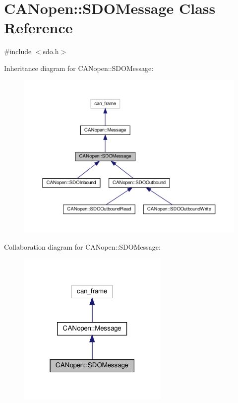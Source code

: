 \hypertarget{class_c_a_nopen_1_1_s_d_o_message}{}\section{C\+A\+Nopen\+:\+:S\+D\+O\+Message Class Reference}
\label{class_c_a_nopen_1_1_s_d_o_message}


{\ttfamily \#include $<$sdo.\+h$>$}



Inheritance diagram for C\+A\+Nopen\+:\+:S\+D\+O\+Message\+:\nopagebreak
\begin{figure}[H]
\begin{center}
\leavevmode
\includegraphics[width=350pt]{class_c_a_nopen_1_1_s_d_o_message__inherit__graph}
\end{center}
\end{figure}


Collaboration diagram for C\+A\+Nopen\+:\+:S\+D\+O\+Message\+:\nopagebreak
\begin{figure}[H]
\begin{center}
\leavevmode
\includegraphics[width=207pt]{class_c_a_nopen_1_1_s_d_o_message__coll__graph}
\end{center}
\end{figure}

